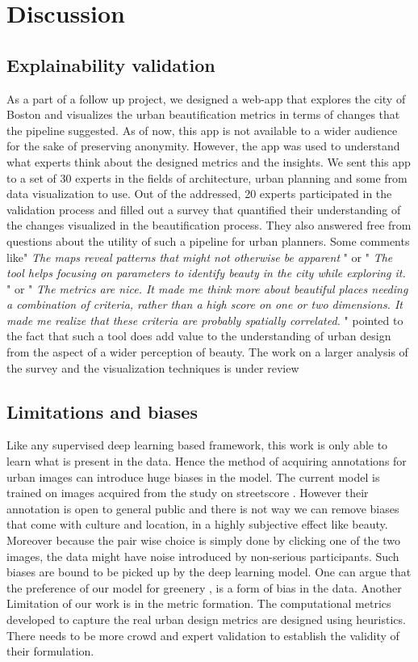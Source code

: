 \section{Discussion}

\subsection{Explainability validation}
As a part of a follow up project, we designed a web-app that explores the city of Boston and visualizes the urban beautification metrics in terms of changes that the pipeline suggested. As of now, this app is not available to a wider audience for the sake of preserving anonymity. However, the app was used to understand what experts think about the designed metrics and the insights. We sent this app to a set of 30 experts in the fields of architecture, urban planning and some from data visualization to use. Out of the addressed, 20 experts participated in the validation process and filled out a survey that quantified their understanding of the changes visualized in the beautification process. They also answered free from questions about the utility of such a pipeline for urban planners. Some comments like" \textit{The maps reveal patterns that might not otherwise be apparent} " or " \textit{The tool helps focusing on parameters to identify beauty in the city while exploring it.} " or " \textit{The metrics are nice. It made me think more about beautiful places needing a combination of criteria, rather than a high score on one or two dimensions. It made me realize that these criteria are probably spatially correlated.} " pointed to the fact that such a tool does add value to the understanding of urban design from the aspect of a wider perception of beauty. The work on a larger analysis of the survey and the visualization techniques is under review

\subsection{Limitations and biases}
Like any supervised deep learning based framework, this work is only able to learn what is present in the data. Hence the method of acquiring annotations  for urban images can introduce huge biases in the model. The current model is trained on images acquired from the study on streetscore \cite{naik2014streetscore}. However their annotation is open to general public and there is not way we can remove biases that come with culture and location, in a highly subjective effect like beauty. Moreover because the pair wise choice is simply done by clicking one of the two images, the data might have noise introduced by non-serious participants. Such biases are bound to be picked up by the deep learning model. One can argue that the preference of our model for greenery , is a form of bias in the data. 
Another Limitation of our work is in the metric formation. The computational metrics developed to capture the real urban design metrics are designed using heuristics. There needs to be more crowd and expert validation to establish the validity of their formulation. 

